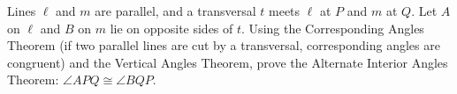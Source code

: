 Lines $\ell$ and $m$ are parallel, and a transversal $t$ meets $\ell$ at $P$ and $m$ at $Q$. Let $A$ on $\ell$ and $B$ on $m$ lie on opposite sides of $t$. Using the Corresponding Angles Theorem (if two parallel lines are cut by a transversal, corresponding angles are congruent) and the Vertical Angles Theorem, prove the Alternate Interior Angles Theorem: $\angle APQ\cong\angle BQP$.
